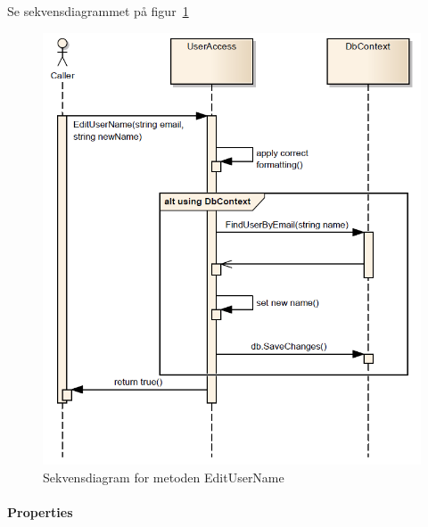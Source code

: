 Se sekvensdiagrammet på figur~\ref{fig:editUserName}

\begin{figure}
\centering
\includegraphics[width=0.7\linewidth]{figs/dbSeq/editUserName.PNG}
\caption{Sekvensdiagram for metoden EditUserName}
\label{fig:editUserName}
\end{figure}


\paragraph{Properties}\